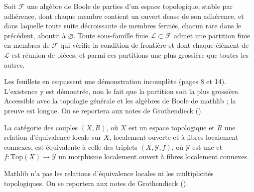 
\begin{encadre}
\begin{conjecture*}
Soit $\mathcal F$ une algèbre de Boole de parties d'un espace topologique, stable par adhérence, dont chaque membre contient un ouvert dense de son adhérence, et dans laquelle toute suite décroissante de membres fermés, chacun rare dans le précédent, aboutit à $\varnothing$. Toute sous-famille finie $\mathcal L \subset \mathcal F$ admet une partition finie en membres de $\mathcal F$ qui vérifie la condition de frontière et dont chaque élément de $\mathcal L$ est réunion de pièces, et parmi ces partitions une plus grossière que toutes les autres.
\end{conjecture*}
\end{encadre}
{\small Les feuillets en esquissent une démonstration incomplète (pages 8 et 14). L'existence y est démontrée, non le fait que la partition soit la plus grossière. Accessible avec la topologie générale et les algèbres de Boole de mathlib ; la preuve est longue. On se reportera aux notes de Grothendieck ().\par}

\begin{encadre}
\begin{conjecture*}
La catégorie des couples $(X, R)$, où $X$ est un espace topologique et $R$ une relation d'équivalence locale sur $X$, localement ouverte et à fibres localement connexes, est équivalente à celle des triplets $(X, \mathcal Y, f)$, où $\mathcal Y$ est une  et $f : \mathrm{Top}(X) \to \mathcal Y$ un morphisme localement ouvert à fibres localement connexes.
\end{conjecture*}
\end{encadre}
{\small Mathlib n'a pas les relations d'équivalence locales ni les multiplicités topologiques. On se reportera aux notes de Grothendieck ().\par}

